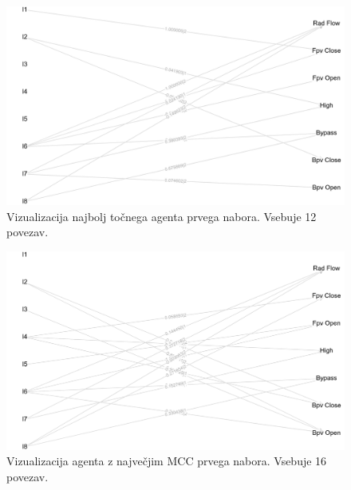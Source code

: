 \begin{figure}[H]
    \begin{center}
        \includegraphics[width=13cm]{shuttle/1/acc_g}
    \end{center}
    \caption{Vizualizacija najbolj točnega agenta prvega nabora. Vsebuje 12 povezav.}
    \label{fig:statlog_acc_1_g}
\end{figure}

\begin{figure}[H]
    \begin{center}
        \includegraphics[width=13cm]{shuttle/1/mcc_g}
    \end{center}
    \caption{Vizualizacija agenta z največjim MCC prvega nabora. Vsebuje 16 povezav.}
    \label{fig:statlog_mcc_1_g}
\end{figure}


